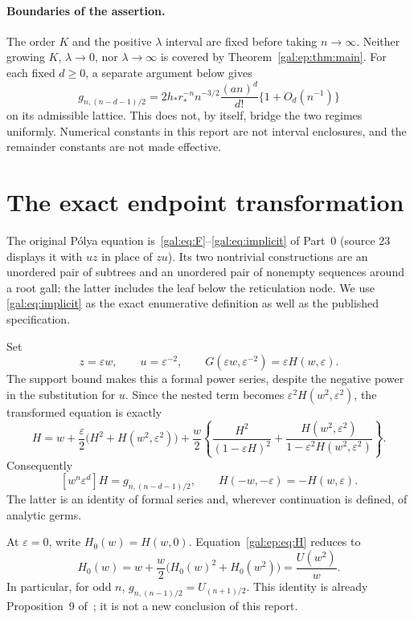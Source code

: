 \documentclass[11pt,letterpaper]{article}
\numberwithin{equation}{section}
\theoremstyle{definition}\newtheorem{definition}[theorem]{Definition}
\theoremstyle{remark}\newtheorem{remark}[theorem]{Remark}
\newcommand{\eps}{\varepsilon}
\newcommand{\coef}[1]{\left[#1\right]}
\newcommand{\Gnd}{g_{n,(n-d-1)/2}}
\begin{document}
\paragraph{Boundaries of the assertion.}
The order $K$ and the positive $\lambda$ interval are fixed before taking $n\to\infty$. Neither growing $K$, $\lambda\to0$, nor $\lambda\to\infty$ is covered by Theorem~\ref{gal:ep:thm:main}. For each fixed $d\ge0$, a separate argument below gives
\begin{equation}\label{gal:ep:eq:fixed}
\Gnd=2h_*r_*^{-n}n^{-3/2}\frac{(an)^d}{d!}\{1+O_d(n^{-1})\}
\end{equation}
on its admissible lattice. This does not, by itself, bridge the two regimes uniformly. Numerical constants in this report are not interval enclosures, and the remainder constants are not made effective.

\section{The exact endpoint transformation}\label{gal:ep:sec:equation}
The original P\'olya equation is~\eqref{gal:eq:F}--\eqref{gal:eq:implicit} of Part~0 (source 23 displays it with $uz$ in place of $zu$). Its two nontrivial constructions are an unordered pair of subtrees and an unordered pair of nonempty sequences around a root gall; the latter includes the leaf below the reticulation node. We use \eqref{gal:eq:implicit} as the exact enumerative definition as well as the published specification.

Set
\[
z=\eps w,\qquad u=\eps^{-2},\qquad
G(\eps w,\eps^{-2})=\eps H(w,\eps).
\]
The support bound makes this a formal power series, despite the negative power in the substitution for $u$. Since the nested term becomes $\eps^2H(w^2,\eps^2)$, the transformed equation is exactly
\begin{equation}\label{gal:ep:eq:H}
\boxed{\ H=w+\frac\eps2\bigl(H^2+H(w^2,\eps^2)\bigr)
 +\frac w2\left\{\frac{H^2}{(1-\eps H)^2}
 +\frac{H(w^2,\eps^2)}{1-\eps^2H(w^2,\eps^2)}\right\}.\ }
\end{equation}
Consequently
\begin{equation}\label{gal:ep:eq:parity}
\coef{w^n\eps^d}H=\Gnd,
\qquad H(-w,-\eps)=-H(w,\eps).
\end{equation}
The latter is an identity of formal series and, wherever continuation is defined, of analytic germs.

At $\eps=0$, write $H_0(w)=H(w,0)$. Equation~\eqref{gal:ep:eq:H} reduces to
\begin{equation}\label{gal:ep:eq:H0}
H_0(w)=w+\frac w2\bigl(H_0(w)^2+H_0(w^2)\bigr)
       =\frac{U(w^2)}w.
\end{equation}
In particular, for odd $n$, $g_{n,(n-1)/2}=U_{(n+1)/2}$. This identity is already Proposition~9 of~\cite{comparison}; it is not a new conclusion of this report.
\end{document}
